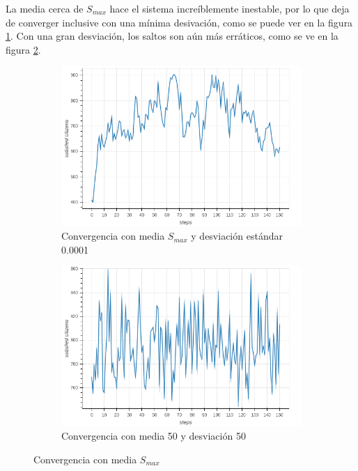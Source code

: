 \documentclass{article}
\begin{document}
\begin{itemize}
    La media cerca de $S_{max}$ hace el sistema increíblemente inestable, por lo
    que deja de converger inclusive con una mínima desivación, como se puede ver
    en la figura \ref{fig:sche-smax-min}. Con una gran desviación, los saltos
    son aún más erráticos, como se ve en la figura \ref{fig:sche-smax-max}.

    \begin{figure}
      \centering
      \begin{subfigure}{0.4\textwidth}
        \includegraphics[width=\textwidth]{imgs/norm_smax_min.png}
        \caption{Convergencia con media $S_{max}$ y desviación estándar 0.0001}
        \label{fig:sche-smax-min}
      \end{subfigure}
      \quad
      \begin{subfigure}{0.4\textwidth}
        \includegraphics[width=\textwidth]{imgs/norm_smax_max.png}
        \caption{Convergencia con media 50 y desviación 50}
        \label{fig:sche-smax-max}
      \end{subfigure}
      \caption{Convergencia con media $S_{max}$}
      \label{fig:sche-n50}
    \end{figure}

\end{itemize}
\end{document}
